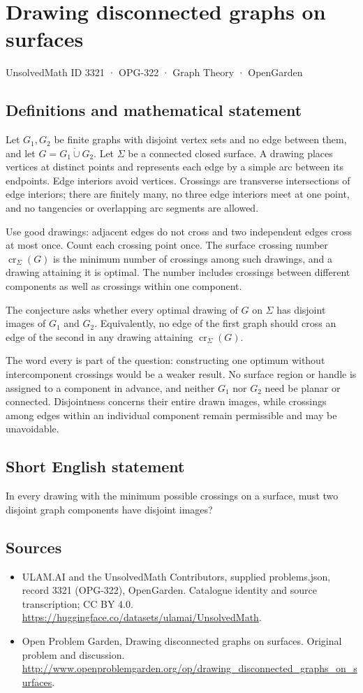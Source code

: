 \documentclass[11pt,a4paper]{article}
\begin{document}
\section*{Drawing disconnected graphs on surfaces}\label{3321}
{\small UnsolvedMath ID 3321 · OPG-322 · Graph Theory · OpenGarden}
\subsection{Definitions and mathematical statement}
Let $G_1,G_2$ be finite graphs with disjoint vertex sets and no edge between them, and let $G=G_1\mathbin{\dot\cup}G_2$. Let $\Sigma$ be a connected closed surface. A drawing places vertices at distinct points and represents each edge by a simple arc between its endpoints. Edge interiors avoid vertices. Crossings are transverse intersections of edge interiors; there are finitely many, no three edge interiors meet at one point, and no tangencies or overlapping arc segments are allowed.

Use good drawings: adjacent edges do not cross and two independent edges cross at most once. Count each crossing point once. The surface crossing number $\operatorname{cr}_\Sigma(G)$ is the minimum number of crossings among such drawings, and a drawing attaining it is optimal. The number includes crossings between different components as well as crossings within one component.

The conjecture asks whether every optimal drawing of $G$ on $\Sigma$ has disjoint images of $G_1$ and $G_2$. Equivalently, no edge of the first graph should cross an edge of the second in any drawing attaining $\operatorname{cr}_\Sigma(G)$.

The word every is part of the question: constructing one optimum without intercomponent crossings would be a weaker result. No surface region or handle is assigned to a component in advance, and neither $G_1$ nor $G_2$ need be planar or connected. Disjointness concerns their entire drawn images, while crossings among edges within an individual component remain permissible and may be unavoidable.
\subsection{Short English statement}
In every drawing with the minimum possible crossings on a surface, must two disjoint graph components have disjoint images?
\subsection{Sources}
\begin{itemize}
\item[S1] ULAM.AI and the UnsolvedMath Contributors, supplied problems.json, record 3321 (OPG-322), OpenGarden. Catalogue identity and source transcription; CC BY 4.0.
\url{https://huggingface.co/datasets/ulamai/UnsolvedMath}.
\item[S2] Open Problem Garden, Drawing disconnected graphs on surfaces. Original problem and discussion.
\url{http://www.openproblemgarden.org/op/drawing_disconnected_graphs_on_surfaces}.
\end{itemize}
\end{document}
